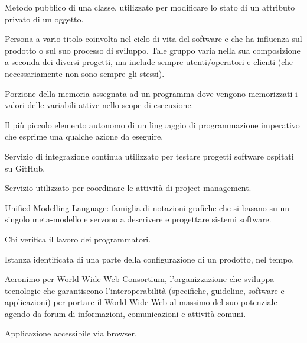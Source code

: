 \item[Setter] Metodo pubblico di una classe, utilizzato per modificare lo stato di un attributo privato di un oggetto.
\item[Stakeholder] Persona a vario titolo coinvolta nel ciclo di vita del software e che ha influenza sul prodotto o sul suo processo di sviluppo. Tale gruppo varia nella sua composizione a seconda dei diversi progetti, ma include sempre utenti/operatori e clienti (che necessariamente non sono sempre gli stessi).
\item[Stack] Porzione della memoria assegnata ad un programma dove vengono memorizzati i valori delle variabili attive nello scope di esecuzione.
\item[Statement] Il più piccolo elemento autonomo di un linguaggio di programmazione imperativo che esprime una qualche azione da eseguire.
\item[Travis] Servizio di integrazione continua utilizzato per testare progetti software ospitati su GitHub.
\item[Trello] Servizio utilizzato per coordinare le attività di project management.
\item[UML] Unified Modelling Language: famiglia di notazioni grafiche che si basano su un singolo meta-modello e servono a descrivere e progettare sistemi software.
\item[verificatore] Chi verifica il lavoro dei programmatori.
\item[versione] Istanza identificata di una parte della configurazione di un prodotto, nel tempo.
\item[W3C] Acronimo per World Wide Web Consortium, l'organizzazione che sviluppa tecnologie che garantiscono l'interoperabilità (specifiche, guideline, software e applicazioni) per portare il World Wide Web al massimo del suo potenziale agendo da forum di informazioni, comunicazioni e attività comuni. 
\item[Web Application] Applicazione accessibile via browser.
